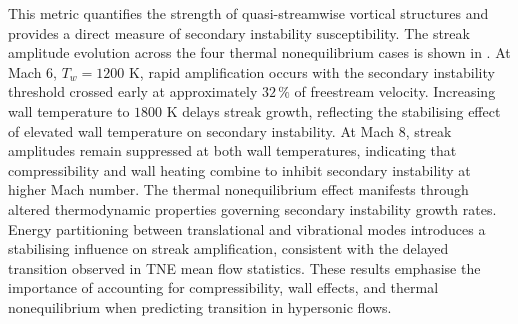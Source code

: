 This metric quantifies the strength of quasi-streamwise vortical structures and provides a direct measure of secondary instability susceptibility. The streak amplitude evolution across the four thermal nonequilibrium cases is shown in . At Mach 6, $T_w = 1200$ K, rapid amplification occurs with the secondary instability threshold crossed early at approximately $32\,\%$ of freestream velocity. Increasing wall temperature to $1800$ K delays streak growth, reflecting the stabilising effect of elevated wall temperature on secondary instability. At Mach 8, streak amplitudes remain suppressed at both wall temperatures, indicating that compressibility and wall heating combine to inhibit secondary instability at higher Mach number. The thermal nonequilibrium effect manifests through altered thermodynamic properties governing secondary instability growth rates. Energy partitioning between translational and vibrational modes introduces a stabilising influence on streak amplification, consistent with the delayed transition observed in \gls{TNE} mean flow statistics. These results emphasise the importance of accounting for compressibility, wall effects, and thermal nonequilibrium when predicting transition in hypersonic flows.









